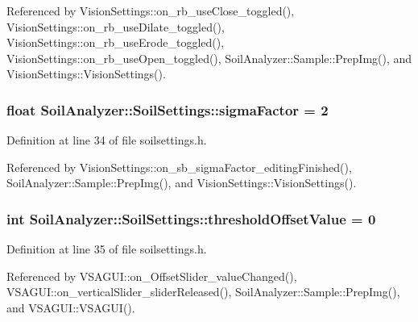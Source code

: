 Referenced by Vision\+Settings\+::on\+\_\+rb\+\_\+use\+Close\+\_\+toggled(), Vision\+Settings\+::on\+\_\+rb\+\_\+use\+Dilate\+\_\+toggled(), Vision\+Settings\+::on\+\_\+rb\+\_\+use\+Erode\+\_\+toggled(), Vision\+Settings\+::on\+\_\+rb\+\_\+use\+Open\+\_\+toggled(), Soil\+Analyzer\+::\+Sample\+::\+Prep\+Img(), and Vision\+Settings\+::\+Vision\+Settings().

\hypertarget{class_soil_analyzer_1_1_soil_settings_a97e62512e12a2ba9210fd93950b6e717}{}
\subsubsection[{sigma\+Factor}]{\setlength{\rightskip}{0pt plus 5cm}float Soil\+Analyzer\+::\+Soil\+Settings\+::sigma\+Factor = 2}\label{class_soil_analyzer_1_1_soil_settings_a97e62512e12a2ba9210fd93950b6e717}


Definition at line 34 of file soilsettings.\+h.



Referenced by Vision\+Settings\+::on\+\_\+sb\+\_\+sigma\+Factor\+\_\+editing\+Finished(), Soil\+Analyzer\+::\+Sample\+::\+Prep\+Img(), and Vision\+Settings\+::\+Vision\+Settings().

\hypertarget{class_soil_analyzer_1_1_soil_settings_a48330eb812672b50a94483f264614e8f}{}
\subsubsection[{threshold\+Offset\+Value}]{\setlength{\rightskip}{0pt plus 5cm}int Soil\+Analyzer\+::\+Soil\+Settings\+::threshold\+Offset\+Value = 0}\label{class_soil_analyzer_1_1_soil_settings_a48330eb812672b50a94483f264614e8f}


Definition at line 35 of file soilsettings.\+h.



Referenced by V\+S\+A\+G\+U\+I\+::on\+\_\+\+Offset\+Slider\+\_\+value\+Changed(), V\+S\+A\+G\+U\+I\+::on\+\_\+vertical\+Slider\+\_\+slider\+Released(), Soil\+Analyzer\+::\+Sample\+::\+Prep\+Img(), and V\+S\+A\+G\+U\+I\+::\+V\+S\+A\+G\+U\+I().

